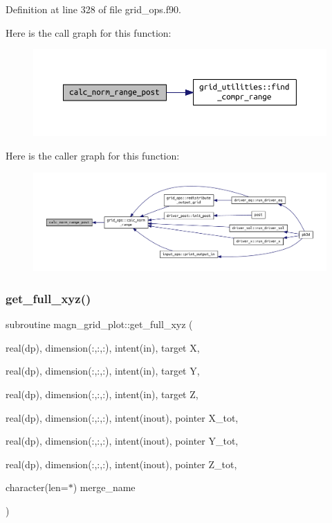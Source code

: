 Definition at line 328 of file grid\+\_\+ops.\+f90.

Here is the call graph for this function\+:
\nopagebreak
\begin{figure}[H]
\begin{center}
\leavevmode
\includegraphics[width=350pt]{grid__ops_8f90_ad037c191ae770bd79529506953f0e307_cgraph}
\end{center}
\end{figure}
Here is the caller graph for this function\+:
\nopagebreak
\begin{figure}[H]
\begin{center}
\leavevmode
\includegraphics[width=350pt]{grid__ops_8f90_ad037c191ae770bd79529506953f0e307_icgraph}
\end{center}
\end{figure}
\mbox{\label{grid__ops_8f90_ab54f19ae54d39ec48cd2602f7ed0e73b}} 
\subsubsection{\texorpdfstring{get\+\_\+full\+\_\+xyz()}{get\_full\_xyz()}}
{\footnotesize\ttfamily subroutine magn\+\_\+grid\+\_\+plot\+::get\+\_\+full\+\_\+xyz (\begin{DoxyParamCaption}\item[{real(dp), dimension(\+:,\+:,\+:), intent(in), target}]{X,  }\item[{real(dp), dimension(\+:,\+:,\+:), intent(in), target}]{Y,  }\item[{real(dp), dimension(\+:,\+:,\+:), intent(in), target}]{Z,  }\item[{real(dp), dimension(\+:,\+:,\+:), intent(inout), pointer}]{X\+\_\+tot,  }\item[{real(dp), dimension(\+:,\+:,\+:), intent(inout), pointer}]{Y\+\_\+tot,  }\item[{real(dp), dimension(\+:,\+:,\+:), intent(inout), pointer}]{Z\+\_\+tot,  }\item[{character(len=$\ast$)}]{merge\+\_\+name }\end{DoxyParamCaption})}



